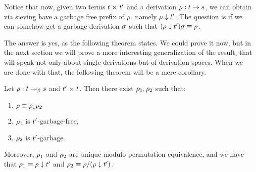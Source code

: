 Notice that now, given two terms $t \mathrel{\ltimes} t'$ and a derivation
$\rho : t \to s$, we can obtain via sieving have a garbage free prefix
of $\rho$, namely $\rho \downarrow t'$.
The question is if we can somehow get a garbage derivation $\sigma$ such that
$(\rho \downarrow t') \sigma \equiv \rho$.

The answer is yes, as the following theorem states.
We could prove it now, but in the next section we will
prove a more interesting generalization of the result,
that will speak not only about single derivations
but of derivation spaces.
When we are done with that, the following theorem will be a mere corollary.


\begin{theorem}
Let $\rho : t \mathrel{\twoheadrightarrow_\beta} s$ and $t' \mathrel{\ltimes} t$.
Then there exist $\rho_1,\rho_2$ such that:
\begin{enumerate}
\item $\rho \equiv \rho_1\rho_2$
\item $\rho_1$ is $t'$-garbage-free,
\item $\rho_2$ is $t'$-garbage.
\end{enumerate}
Moreover, $\rho_1$ and $\rho_2$ are unique modulo permutation equivalence,
and we have that
$\rho_1 \equiv \rho \downarrow t'$ and $\rho_2 \equiv \rho/(\rho \downarrow t')$.
\end{theorem}
